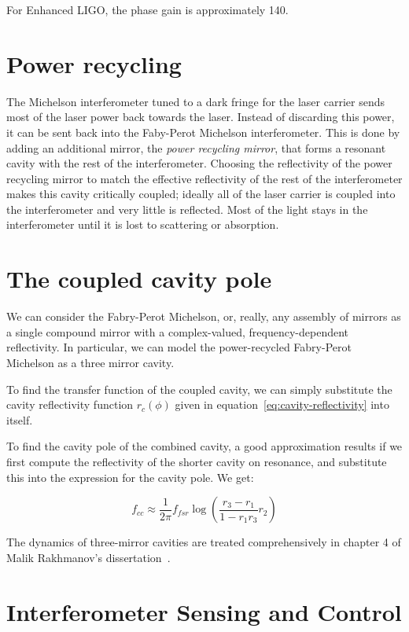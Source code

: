 For Enhanced LIGO, the phase gain is approximately 140.

\section{Power recycling}

The Michelson interferometer tuned to a dark fringe for the laser
carrier sends most of the laser power back towards the laser.  Instead
of discarding this power, it can be sent back into the Faby-Perot
Michelson interferometer.  This is done by adding an additional
mirror, the \emph{power recycling mirror}, that forms a resonant
cavity with the rest of the interferometer.  Choosing the reflectivity
of the power recycling mirror to match the effective reflectivity of
the rest of the interferometer makes this cavity critically coupled;
ideally all of the laser carrier is coupled into the interferometer
and very little is reflected.  Most of the light stays in the
interferometer until it is lost to scattering or absorption.

\section{The coupled cavity pole}

We can consider the Fabry-Perot Michelson, or, really, any assembly of
mirrors as a single compound mirror with a complex-valued,
frequency-dependent reflectivity.  In particular, we can model the
power-recycled Fabry-Perot Michelson as a three mirror cavity.

To find the transfer function of the coupled cavity, we can simply
substitute the cavity reflectivity function $r_c(\phi)$ given in
equation~\ref{eq:cavity-reflectivity} into itself.  

To find the cavity pole of the combined cavity, a good approximation
results if we first compute the reflectivity of the shorter cavity on
resonance, and substitute this into the expression for the cavity pole.
We get:

\begin{equation}
f_{cc} \approx \frac{1}{2\pi} f_{fsr} \log \left(\frac{r_3 - r_1}{1 - r_1 r_3} r_2\right)
\end{equation}

The dynamics of three-mirror cavities are treated comprehensively in
chapter 4 of Malik Rakhmanov's dissertation~\cite{Rakhmanov2000Dynamics}.

\section{Interferometer Sensing and Control}
\label{sec:isc}

